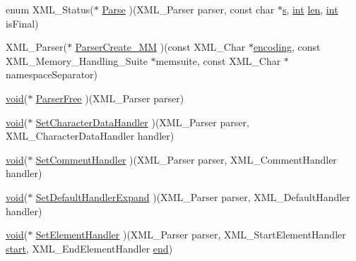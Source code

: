 \begin{DoxyCompactItemize}
\item 
enum X\+M\+L\+\_\+\+Status($\ast$ \mbox{\hyperlink{struct_py_expat___c_a_p_i_a7d1e36f41cf7327ea479886dadb31321}{Parse}} )(X\+M\+L\+\_\+\+Parser parser, const char $\ast$\mbox{\hyperlink{_s_d_l__opengl_8h_a4af680a6c683f88ed67b76f207f2e6e4}{s}}, \mbox{\hyperlink{warnings_8h_a74f207b5aa4ba51c3a2ad59b219a423b}{int}} \mbox{\hyperlink{_s_d_l__opengl__glext_8h_a652168017ea9a8bbcead03d5c16269fb}{len}}, \mbox{\hyperlink{warnings_8h_a74f207b5aa4ba51c3a2ad59b219a423b}{int}} is\+Final)
\item 
X\+M\+L\+\_\+\+Parser($\ast$ \mbox{\hyperlink{struct_py_expat___c_a_p_i_abb499eb0db9d22b485ed45be20100bd9}{Parser\+Create\+\_\+\+MM}} )(const X\+M\+L\+\_\+\+Char $\ast$\mbox{\hyperlink{stringobject_8h_a8bf289d3d3f54f840150ecab442b16b1}{encoding}}, const X\+M\+L\+\_\+\+Memory\+\_\+\+Handling\+\_\+\+Suite $\ast$memsuite, const X\+M\+L\+\_\+\+Char $\ast$namespace\+Separator)
\item 
\mbox{\hyperlink{_s_d_l__opengles2__gl2ext_8h_ae5d8fa23ad07c48bb609509eae494c95}{void}}($\ast$ \mbox{\hyperlink{struct_py_expat___c_a_p_i_a6f02d5578475c187cc6e187a15308eba}{Parser\+Free}} )(X\+M\+L\+\_\+\+Parser parser)
\item 
\mbox{\hyperlink{_s_d_l__opengles2__gl2ext_8h_ae5d8fa23ad07c48bb609509eae494c95}{void}}($\ast$ \mbox{\hyperlink{struct_py_expat___c_a_p_i_a7440612167b3fa8089d41411a0904409}{Set\+Character\+Data\+Handler}} )(X\+M\+L\+\_\+\+Parser parser, X\+M\+L\+\_\+\+Character\+Data\+Handler handler)
\item 
\mbox{\hyperlink{_s_d_l__opengles2__gl2ext_8h_ae5d8fa23ad07c48bb609509eae494c95}{void}}($\ast$ \mbox{\hyperlink{struct_py_expat___c_a_p_i_a9199d4d4f57dda08f2e798351cdbb7ab}{Set\+Comment\+Handler}} )(X\+M\+L\+\_\+\+Parser parser, X\+M\+L\+\_\+\+Comment\+Handler handler)
\item 
\mbox{\hyperlink{_s_d_l__opengles2__gl2ext_8h_ae5d8fa23ad07c48bb609509eae494c95}{void}}($\ast$ \mbox{\hyperlink{struct_py_expat___c_a_p_i_a0bee5d83ab5e9eb578ffb92cd60f8043}{Set\+Default\+Handler\+Expand}} )(X\+M\+L\+\_\+\+Parser parser, X\+M\+L\+\_\+\+Default\+Handler handler)
\item 
\mbox{\hyperlink{_s_d_l__opengles2__gl2ext_8h_ae5d8fa23ad07c48bb609509eae494c95}{void}}($\ast$ \mbox{\hyperlink{struct_py_expat___c_a_p_i_a53fc65a60b9dae1d652221e2dfdeb4d0}{Set\+Element\+Handler}} )(X\+M\+L\+\_\+\+Parser parser, X\+M\+L\+\_\+\+Start\+Element\+Handler \mbox{\hyperlink{_s_d_l__opengl_8h_ac55adc720a3098c1b454d2a4647f4361}{start}}, X\+M\+L\+\_\+\+End\+Element\+Handler \mbox{\hyperlink{_s_d_l__opengl_8h_a432111147038972f06e049e18a837002}{end}})

\end{DoxyCompactItemize}
